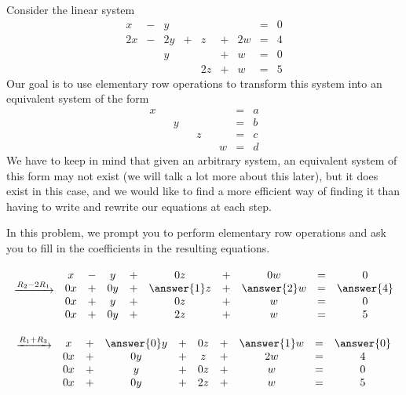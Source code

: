 \documentclass{ximera}
\begin{document}
\begin{exploration}\label{init:augmentedmatrixex}
Consider the linear system
\begin{equation}\label{eq:sys20originalsystem1}
\begin{array}{ccccccccc}
      x &- &y&&&&&= &0 \\
	 2x& -&2y&+&z&+&2w&=&4\\
     & &y&&&+&w&=&0\\
     & &&&2z&+&w&=&5
    \end{array}
    \end{equation}
Our goal is to use elementary row operations to transform this system into an equivalent system of the form
\begin{equation}\begin{array}{ccccccccc}
      x & &&&&&&= &a \\
	 & &y&&&&&=&b\\
     & &&&z&&&=&c\\
     & &&&&&w&=&d
    \end{array}
    \end{equation}
 We have to keep in mind that given an arbitrary system, an equivalent system of this form may not exist (we will talk a lot more about this later), but it does exist in this case, and we would like to find a more efficient way of finding it than having to write and rewrite our equations at each step.   
 
In this problem, we prompt you to perform elementary row operations and ask you to fill in the coefficients in the resulting equations.
 
$$\begin{array}{c}
 \\
 \xrightarrow{R_2-2R_1}\\
\\
\\
 \end{array}
\begin{array}{ccccccccc}
      x &- &y&+&0z&+&0w&= &0 \\
	 0x& +&0y&+&\answer{1}z&+&\answer{2}w&=&\answer{4}\\
     0x& +&y&+&0z&+&w&=&0\\
     0x&+&0y&+&2z&+&w&=&5
    \end{array}$$
    
 $$
 \begin{array}{c}
 \xrightarrow{R_1+R_3}\\
 \\
\\
\\
 \end{array}
 \begin{array}{ccccccccc}
      x &+ &\answer{0}y&+&0z&+&\answer{1}w&= &\answer{0} \\
	 0x& +&0y&+&z&+&2w&=&4\\
     0x& +&y&+&0z&+&w&=&0\\
     0x&+&0y&+&2z&+&w&=&5
    \end{array}$$
 


\end{exploration}
\end{document}
